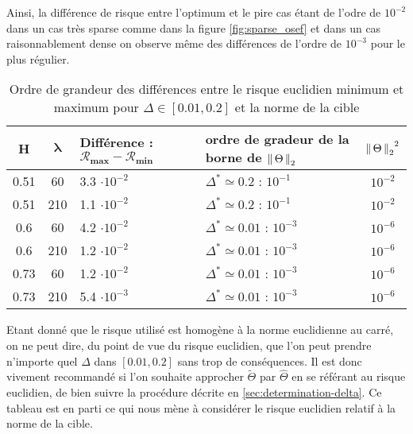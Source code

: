 Ainsi, la différence de risque entre l'optimum et le pire cas étant de l'odre de $10^{-2}$ dans un cas très sparse comme dans la figure \ref{fig:sparse_osef} et dans un cas raisonnablement dense on observe même des différences de l'ordre de $10^{-3}$ pour le plus régulier.


\begin{table}[H]
	\centering
	\begin{tabularx}{0.7\textwidth}{|cc|X|X|c|}
		\toprule
		\textbf{H} & $\mathbf{\lambda}$ & \textbf{Différence : } $\mathbf{\mathcal R_{max} - \mathcal R_{min}}$ & ordre de gradeur de la borne de $\left\lVert \, \Theta \, \right\rVert _ {2}$ & ${\left\lVert \, \Theta \, \right\rVert _ {2}}^2$ \\
		\midrule
		0.51       & 60                 & 3.3 $\cdot 10^{-2}$                                                   & $\Delta^* \simeq 0.2$ : $10^{-1}$                 & $10^{-2}$             \\
		0.51       & 210                & 1.1 $\cdot 10^{-2}$                                                   & $\Delta^* \simeq 0.2$ : $10^{-1}$                 & $10^{-2}$             \\
		\midrule
		0.6        & 60                 & 4.2 $\cdot 10^{-2}$                                                   & $\Delta^* \simeq 0.01$ : $10^{-3}$                & $10^{-6}$             \\
		0.6        & 210                & 1.2 $\cdot 10^{-2}$                                                   & $\Delta^* \simeq 0.01$ : $10^{-3}$                & $10^{-6}$             \\
		\midrule
		0.73       & 60                 & 1.2 $\cdot 10^{-2}$                                                   & $\Delta^* \simeq 0.01$ : $10^{-3}$                & $10^{-6}$             \\
		0.73       & 210                & 5.4 $\cdot 10^{-3}$                                                   & $\Delta^* \simeq 0.01$ : $10^{-3}$                & $10^{-6}$             \\
		\bottomrule
	\end{tabularx}
	\caption{Ordre de grandeur des différences entre le risque euclidien minimum et maximum pour $\Delta \in [0.01, 0.2]$ et la norme de la cible}
	\label{tab:ordre_grandeur_diff_R_norme}
\end{table}

Etant donné que le risque utilisé est homogène à la norme euclidienne au carré, on ne peut dire, du point de vue du risque euclidien, que l'on peut prendre n'importe quel $\Delta$ dans $[0.01, 0.2]$ sans trop de conséquences. Il est donc vivement recommandé si l'on souhaite approcher $\widetilde \Theta$ par $\widehat \Theta$ en se référant au risque euclidien, de bien suivre la procédure décrite en \ref{sec:determination-delta}.
Ce tableau est en parti ce qui nous mène à considérer le risque euclidien relatif à la norme de la cible.
